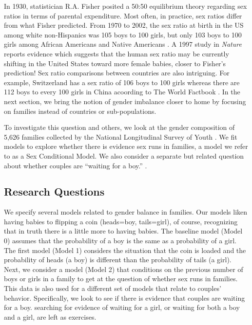 \documentclass[
]{krantz}
\begin{document}
In 1930, statistician R.A. Fisher posited a 50:50 equilibrium theory regarding sex ratios in terms of parental expenditure. Most often, in practice, sex ratios differ from what Fisher predicted. From 1970 to 2002, the sex ratio at birth in the US among white non-Hispanics was 105 boys to 100 girls, but only 103 boys to 100 girls among African Americans and Native Americans \citep{Mathews2005}. A 1997 study in \emph{Nature} reports evidence which suggests that the human sex ratio may be currently shifting in the United States toward more female babies, closer to Fisher's prediction! \citep{Komdeur1997} Sex ratio comparisons between countries are also intriguing. For example, Switzerland has a sex ratio of 106 boys to 100 girls whereas there are 112 boys to every 100 girls in China acoording to The World Factbook \citep{CIA2013}. In the next section, we bring the notion of gender imbalance closer to home by focusing on families instead of countries or sub-populations.

To investigate this question and others, we look at the gender composition of 5,626 families collected by the National Longitudinal Survey of Youth \citep{NLSY1997}. We fit models to explore whether there is evidence sex runs in families, a model we refer to as a Sex Conditional Model. We also consider a separate but related question about whether couples are ``waiting for a boy.'' \citep{Rodgers2001}.

\hypertarget{research-questions}{%
\subsection{Research Questions}\label{research-questions}}

We specify several models related to gender balance in families. Our models liken having babies to flipping a coin (heads=boy, tails=girl), of course, recognizing that in truth there is a little more to having babies. The baseline model (Model 0) assumes that the probability of a boy is the same as a probability of a girl. The first model (Model 1) considers the situation that the coin is loaded and the probability of heads (a boy) is different than the probability of tails (a girl). Next, we consider a model (Model 2) that conditions on the previous number of boys or girls in a family to get at the question of whether sex runs in families. This data is also used for a different set of models that relate to couples' behavior. Specifically, we look to see if there is evidence that couples are waiting for a boy. searching for evidence of waiting for a girl, or waiting for both a boy and a girl, are left as exercises.
\end{document}
